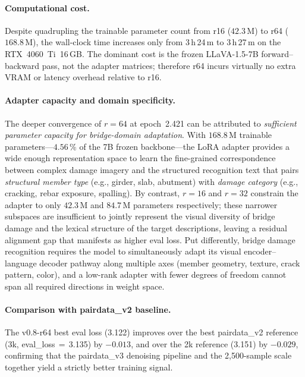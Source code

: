 \documentclass[onecolumn]{article}
\begin{document}
\paragraph{Computational cost.}
Despite quadrupling the trainable parameter count from r16
($42.3$\,M) to r64 ($168.8$\,M), the wall-clock time increases only from
3\,h\,24\,m to 3\,h\,27\,m on the RTX~4060~Ti~16\,GB.
The dominant cost is the frozen LLaVA-1.5-7B forward--backward pass, not
the adapter matrices; therefore r64 incurs virtually no extra VRAM or
latency overhead relative to r16.

\paragraph{Adapter capacity and domain specificity.}
The deeper convergence of $r=64$ at epoch~2.421 can be attributed to
\emph{sufficient parameter capacity for bridge-domain adaptation}.
With $168.8$\,M trainable parameters---$4.56$\,\% of the
7B frozen backbone---the LoRA adapter provides a wide enough
representation space to learn the fine-grained correspondence between
complex damage imagery and the structured recognition text that pairs
\emph{structural member type} (e.g., girder, slab, abutment) with
\emph{damage category} (e.g., cracking, rebar exposure, spalling).
By contrast, $r=16$ and $r=32$ constrain the adapter to only
$42.3$\,M and $84.7$\,M parameters respectively; these narrower
subspaces are insufficient to jointly represent the visual diversity
of bridge damage and the lexical structure of the target descriptions,
leaving a residual alignment gap that manifests as higher eval loss.
Put differently, bridge damage recognition requires the model to
simultaneously adapt its visual encoder--language decoder pathway
along multiple axes (member geometry, texture, crack pattern, color),
and a low-rank adapter with fewer degrees of freedom cannot span
all required directions in weight space.

\paragraph{Comparison with pairdata\_v2 baseline.}
The v0.8-r64 best eval loss (3.122) improves over the best pairdata\_v2
reference (3k, eval\_loss\,$=$\,3.135) by \textbf{$-0.013$}, and over the
2k reference (3.151) by \textbf{$-0.029$}, confirming that the pairdata\_v3
denoising pipeline and the 2{,}500-sample scale together yield a strictly
better training signal.
\end{document}
